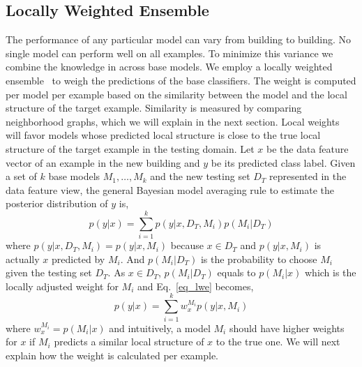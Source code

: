 \subsection{Locally Weighted Ensemble}
The performance of any particular model can vary from building to building.  No single model can perform well on all examples. 
To minimize this variance we combine the knowledge in across base models.  %
We employ a locally weighted ensemble~\cite{lwe} to weigh the predictions of the base classifiers. 
The weight is computed per model per example based on the similarity between the model and the local structure of the target example. 
Similarity is measured by comparing neighborhood graphs, which we will explain in the next section. 
Local weights will favor models whose predicted local structure is close to the true local structure of the target example in the testing domain. 
Let $x$ be the data feature vector of an example in the new building and $y$ be its predicted class label. Given a set of $k$ base models $M_1, \dots, M_k$ and the new testing set $D_T$ represented in the data feature view, the general Bayesian model averaging rule to estimate the posterior distribution of $y$ is,
\begin{equation}\label{eq_lwe}
p(y|x)=\sum_{i=1}^k p(y|x,D_T,M_i) p(M_i|D_T)
\end{equation}
where $p(y|x,D_T,M_i) = p(y|x,M_i)$ because $x \in D_T$ and $p(y|x,M_i)$ is actually $x$ predicted by $M_i$. And $p(M_i|D_T)$ is the probability to choose $M_i$ given the testing set $D_T$. As $x \in D_T$, $p(M_i|D_T)$ equals to $p(M_i|x)$ which is the locally adjusted weight for $M_i$ and Eq.~\ref{eq_lwe} becomes,
\begin{equation}\label{eq_sum}
p(y|x)=\sum_{i=1}^k w_{x}^{M_i} p(y|x, M_i)
\end{equation}
where $w_{x}^{M_i} = p(M_i|x)$ and intuitively, a model $M_i$ should have higher weights for $x$ if $M_i$ predicts a similar local structure of $x$ to the true one.
We will next explain how the weight is calculated per example.

